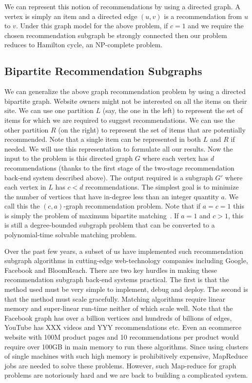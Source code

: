 We can represent this notion of recommendations by using a directed graph. A vertex is simply an item and a directed edge $(u, v)$ is a recommendation from $u$ to $v$. Under this graph model for the above problem, if $c=1$ and we require the chosen recommendation subgraph be strongly connected then our problem reduces to Hamilton cycle, an NP-complete problem. \vs

\subsection{Bipartite Recommendation Subgraphs}

We can generalize the above graph recommendation problem by using a directed bipartite graph. Website owners might not be interested on all the items on their site. We can use one partition $L$ (say, the one in the left) to represent the set of items for which we are required  to suggest recommendations. We can use the other partition $R$ (on the right) to represent the set of items that are potentially recommended. Note that a single item can be represented in both $L$ and $R$ if needed. We will use this representation to formulate all our results. Now the input
to the problem is this directed graph $G$ where each vertex has $d$ recommendations (thanks to the first stage of the two-stage recommendation back-end system described above). The output required is a subgraph $G'$ where each vertex in $L$ has $c < d$ recommendations. The simplest goal is to minimize the number of vertices that have in-degree less than an integer quantity $a$. We call this the $(c, a)$-graph recommendation problem. Note that if $a=c=1$ this is simply the problem of maximum bipartite matching~\cite{LovaszPlummer}. If $a=1$ and $c > 1$, this is still a degree-bounded subgraph problem that can be converted to a polynomial-time solvable matching problem.  \vs

Over the past few years, a subset of us have implemented such recommendation subgraph algorithms in cutting-edge web-technology companies including Google, Facebook and BloomReach. There are two key hurdles in making these recommendation subgraph back-end systems practical. The first is that the method used must be very simple to implement, debug and deploy. The second is that the method must scale gracefully.  Matching algorithms require linear memory and super-linear run-time neither of which scale well. Note that the Facebook graph has over a billion vertices\cite{} and hundreds of billions of edges\cite{}, YouTube has XXX videos and YYY recommendations\cite{} etc. Even an ecommerce website with 100M product pages and 10 recommendations per product would require over 100GB in main memory to run these algorithms. Since using clusters of single machines with such high memory is prohibitively expensive, MapReduce\cite{} jobs are needed to solve these problems. However, such Map-reduce for graph problems are notoriously hard and we are back to building a complicated system. \vs

